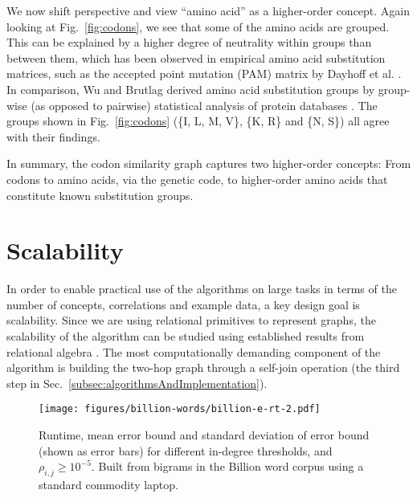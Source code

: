 \documentclass{sig-alternate}
\newcommand{\comment}[1]{{\small \color{red} {#1}} \normalcolor}
\newcommand{\rn}[1]{\rho_{#1}}
\begin{document}
We now shift perspective and view ``amino acid'' as a higher-order concept. Again looking at Fig.\ \ref{fig:codons},
we see that some of the amino acids are grouped. This can be explained by a higher degree of neutrality within groups
than between them, which has been observed in empirical amino acid substitution matrices, such as the accepted point
mutation (PAM) matrix by Dayhoff et al. \cite{Dayhoff78}. In comparison, Wu and Brutlag derived amino acid substitution
groups by group-wise (as opposed to pairwise) statistical analysis of protein databases \cite{Wu96}.  The groups shown
in Fig.\ \ref{fig:codons} (\{I, L, M, V\}, \{K, R\} and \{N, S\}) all agree with their findings.

\begin{sloppypar}
In summary, the codon similarity graph captures two higher-order concepts: From codons to amino acids, via the genetic code, to higher-order amino acids that constitute known substitution groups.
\end{sloppypar}

\section{Scalability}
\label{sec: scalability}

In order to enable practical use of the algorithms on large tasks in terms of the number of concepts, correlations and example data,
a key design goal is scalability. Since we are using
relational primitives to represent graphs,
the scalability of the algorithm can be studied using established results from
relational algebra \cite{Chandra77, bitton83}. The most computationally demanding component of the algorithm is
building the two-hop graph through a self-join operation (the third step in Sec.\ \ref{subsec:algorithmsAndImplementation}).


\begin{figure}
\begin{centering}
\texttt{[image: figures/billion-words/billion-e-rt-2.pdf]}
\end{centering}
\caption{Runtime, mean error bound and standard deviation of error bound (shown as error bars) for different in-degree thresholds, and $\rn{i,j} \geq 10^{-5}$. Built from bigrams in the Billion word corpus using a standard commodity laptop.}
\label{fig:billion-e-runtime}
\end{figure}
\end{document}
